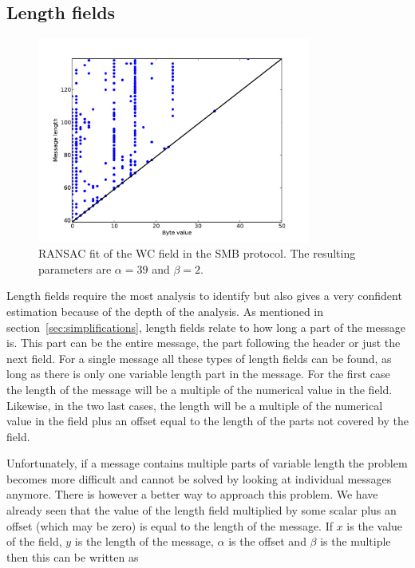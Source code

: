 \documentclass[a4paper]{report}
\begin{document}
\subsection{Length fields}

\begin{figure}[h]
    \centering
    \includegraphics[width=0.8\textwidth]{length}
    \captionsetup{width=0.8\textwidth}
    \caption{RANSAC fit of the WC field in the SMB protocol. The resulting
    parameters are $\alpha = 39$ and $\beta = 2$.}
    \label{fig:length}
\end{figure}

Length fields require the most analysis to identify but also gives a very
confident estimation because of the depth of the analysis. As mentioned in
section~\ref{sec:simplifications}, length fields relate to how long a part of
the message is. This part can be the entire message, the part following the
header or just the next field. For a single message all these types of length
fields can be found, as long as there is only one variable length part in the
message. For the first case the length of the message will be a multiple of the
numerical value in the field. Likewise, in the two last cases, the length will
be a multiple of the numerical value in the field plus an offset equal to the
length of the parts not covered by the field.

Unfortunately, if a message contains multiple parts of variable length the
problem becomes more difficult and cannot be solved by looking at individual
messages anymore. There is however a better way to approach this problem. We
have already seen that the value of the length field multiplied by some scalar
plus an offset (which may be zero) is equal to the length of the message. If
$x$ is the value of the field, $y$ is the length of the message, $\alpha$ is the
offset and $\beta$ is the multiple then this can be written as
\end{document}
